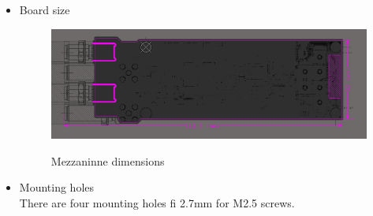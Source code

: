\begin{itemize}

	\item Board size
		\begin{figure}[htbp!]
			\centering
			\includegraphics[width=17cm]{img/MEZZ.png}\\
			\caption{Mezzaninne dimensions}
		\end{figure}	
	\item Mounting holes\\
	There are four mounting holes fi 2.7mm for M2.5 screws.
\end{itemize}

%
%
